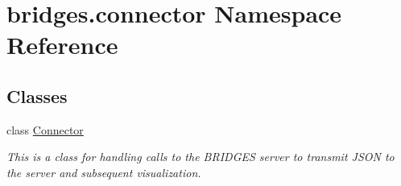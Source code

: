 \hypertarget{namespacebridges_1_1connector}{}\section{bridges.\+connector Namespace Reference}
\label{namespacebridges_1_1connector}
\subsection*{Classes}
\begin{DoxyCompactItemize}
\item 
class \hyperlink{classbridges_1_1connector_1_1_connector}{Connector}
\begin{DoxyCompactList}\small\item\em This is a class for handling calls to the B\+R\+I\+D\+G\+ES server to transmit J\+S\+ON to the server and subsequent visualization. \end{DoxyCompactList}\end{DoxyCompactItemize}
